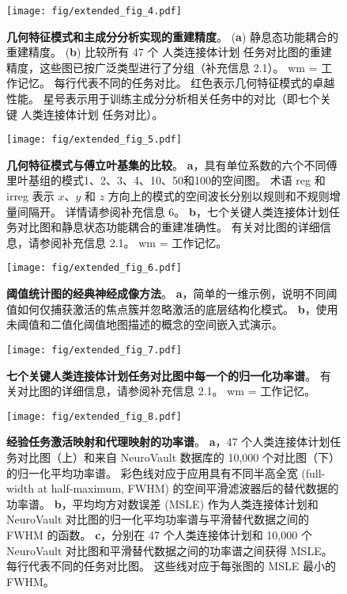 \documentclass[lang=cn,a4paper,newtx]{elegantpaper}
\begin{document}
\begin{figure}[!htb] 
	\centering
	\texttt{[image: fig/extended\_fig\_4.pdf]}
	\caption{\textbf{几何特征模式和主成分分析实现的重建精度}。
	(\textbf{a}) 静息态功能耦合的重建精度。
	(\textbf{b}) 比较所有 47 个 人类连接体计划 任务对比图的重建精度，这些图已按广泛类型进行了分组（补充信息 2.1）。
	wm = 工作记忆。
	每行代表不同的任务对比。
	红色表示几何特征模式的卓越性能。
	星号表示用于训练主成分分析相关任务中的对比（即七个关键 人类连接体计划 任务对比）。}
	\label{fig:extended_fig_4}
\end{figure}


\begin{figure}[!htb] 
	\centering
	\texttt{[image: fig/extended\_fig\_5.pdf]}
	\caption{\textbf{几何特征模式与傅立叶基集的比较}。
	\textbf{a}，具有单位系数的六个不同傅里叶基组的模式1、2、3、4、10、50和100的空间图。
	术语 reg 和 irreg 表示 $ x $、$ y $ 和 $ z $ 方向上的模式的空间波长分别以规则和不规则增量间隔开。
	详情请参阅补充信息 6。
	\textbf{b}，七个关键人类连接体计划任务对比图和静息状态功能耦合的重建准确性。
	有关对比图的详细信息，请参阅补充信息 2.1。
	wm = 工作记忆。}
	\label{fig:extended_fig_5}
\end{figure}


\begin{figure}[!htb] 
	\centering
	\texttt{[image: fig/extended\_fig\_6.pdf]}
	\caption{\textbf{阈值统计图的经典神经成像方法}。
	\textbf{a}，简单的一维示例，说明不同阈值如何仅捕获激活的焦点簇并忽略激活的底层结构化模式。
	\textbf{b}，使用未阈值和二值化阈值地图描述的概念的空间嵌入式演示。}
	\label{fig:extended_fig_6}
\end{figure}


\begin{figure}[!htb] 
	\centering
	\texttt{[image: fig/extended\_fig\_7.pdf]}
	\caption{\textbf{七个关键人类连接体计划任务对比图中每一个的归一化功率谱}。
	有关对比图的详细信息，请参阅补充信息 2.1。
	wm = 工作记忆。}
	\label{fig:extended_fig_7}
\end{figure}


\begin{figure}[!htb] 
	\centering
	\texttt{[image: fig/extended\_fig\_8.pdf]}
	\caption{\textbf{经验任务激活映射和代理映射的功率谱}。
	\textbf{a}，47 个人类连接体计划任务对比图（上）和来自 NeuroVault 数据库的 10,000 个对比图（下）的归一化平均功率谱。
	彩色线对应于应用具有不同半高全宽 (full-width at
	half-maximum, FWHM) 的空间平滑滤波器后的替代数据的功率谱。
	\textbf{b}，平均均方对数误差 (MSLE) 作为人类连接体计划和 NeuroVault 对比图的归一化平均功率谱与平滑替代数据之间的 FWHM 的函数。
	\textbf{c}，分别在 47 个人类连接体计划和 10,000 个 NeuroVault 对比图和平滑替代数据之间的功率谱之间获得 MSLE。
	每行代表不同的任务对比图。
	这些线对应于每张图的 MSLE 最小的 FWHM。}
	\label{fig:extended_fig_8}
\end{figure}
\end{document}
